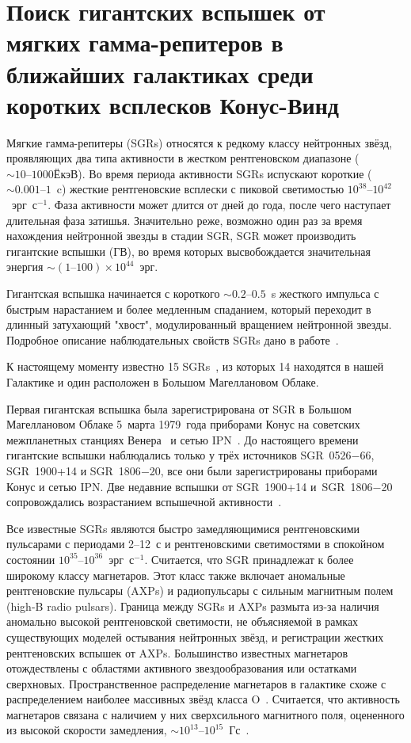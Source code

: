 \chapter{Поиск гигантских вспышек от мягких гамма-репитеров в ближайших галактиках 
         среди коротких всплесков Конус-Винд} \label{chapt4}
Мягкие гамма-репитеры (SGRs) относятся к редкому классу нейтронных звёзд, проявляющих 
два типа активности в жестком рентгеновском диапазоне ($\sim 10\textrm{--}1000$ЁкэВ). 
Во время периода активности SGRs испускают короткие ($\sim0.001\textrm{--}1$~c) жесткие рентгеновские всплески 
с пиковой светимостью $10^{38}\textrm{--}10^{42}$~эрг~с$^{-1}$. Фаза активности может длится 
от дней до года, после чего наступает длительная фаза затишья. Значительно реже, 
возможно один раз за время нахождения нейтронной звезды в стадии SGR, SGR может 
производить гигантские вспышки (ГВ), во время которых высвобождается значительная 
энергия $\sim(1\textrm{--}100)\times 10^{44}$~эрг.

Гигантская вспышка начинается с короткого $\sim 0.2\textrm{--}0.5$~s жесткого 
импульса с быстрым нарастанием и более медленным спаданием, который переходит 
в длинный затухающий "хвост", модулированный вращением нейтронной звезды. 
Подробное описание наблюдательных свойств SGRs дано в работе~\citep{Mereghetti2013}.

К настоящему моменту известно 15 SGRs~\citep{Olausen_Kaspi2014}, из которых 14 
находятся в нашей Галактике и один расположен в Большом Магеллановом Облаке. 

Первая гигантская вспышка была зарегистрирована от SGR в Большом Магеллановом Облаке 
5~марта 1979~года приборами Конус на советских межпланетных станциях 
Венера~\citep{Golenetskii1979SvAL, Mazets1979} 
и сетью IPN~\citep{Barat1979, Cline1980, Evans1980, Cline1982}. 
До настоящего времени гигантские вспышки наблюдались только у трёх источников 
SGR~0526$-$66, SGR~1900+14 и SGR~1806$-$20, все они были зарегистрированы 
приборами Конус и сетью IPN. Две недавние вспышки от SGR~1900+14 и~SGR~1806$-$20 
сопровождались возрастанием вспышечной активности~\citep{Mazets1999a, Frederiks2007}.

Все известные SGRs являются быстро замедляющимися рентгеновскими пульсарами 
с периодами 2--12~с и рентгеновскими светимостями в спокойном состоянии 
$10^{35}\textrm{--}10^{36}$~эрг~с$^{-1}$. Считается, что SGR принадлежат к 
более широкому классу магнетаров. Этот класс также включает аномальные 
рентгеновские пульсары (AXPs) и радиопульсары с сильным магнитным полем (high-B radio pulsars).
Граница между SGRs и AXPs размыта из-за наличия аномально высокой рентгеновской светимости,
не объясняемой в рамках существующих моделей остывания нейтронных звёзд, 
и регистрации жестких рентгеновских вспышек от AXPs. Большинство известных 
магнетаров отождествлены с областями активного звездообразования или остатками сверхновых.
Пространственное распределение магнетаров в галактике схоже с распределением 
наиболее массивных звёзд класса O~\citep{Olausen_Kaspi2014}. Считается, что 
активность магнетаров связана с наличием у них сверхсильного магнитного поля,
оцененного из высокой скорости замедления, 
$\sim 10^{13}\textrm{--}10^{15}$~Гс~\citep{Thompson_and_Duncan_1995MNRAS, Thompson_and_Duncan_1996ApJ}.


